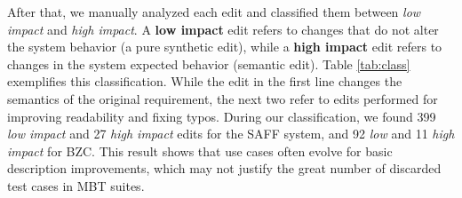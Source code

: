 After that, we manually analyzed each edit and classified them between \textit{low impact} and \textit{high impact}. A \textbf{low impact} edit refers to changes that do not alter the system behavior (a pure synthetic edit), while a \textbf{high impact} edit refers to changes in the system expected behavior (semantic edit). Table \ref{tab:class} exemplifies this classification. While the edit in the first line changes the semantics of the original requirement, the next two refer to edits performed for improving readability and fixing typos. During our classification, we found 399 \textit{low impact} and 27 \textit{high impact} edits for the SAFF system, and 92 \textit{low} and 11 \textit{high impact} for BZC. This result shows that use cases often evolve for basic description improvements, which may not justify the great number of discarded test cases in MBT suites.

\begin{table}[]
\caption{Classification of edits.}
\label{tab:class}
\end{table}

